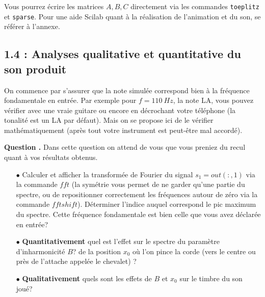 \documentclass[a4,12pt]{article}
\newcounter{Nbquestion}
\newcommand*\question{%
\stepcounter{Nbquestion}%
\textbf{Question \theNbquestion. }}
\begin{document}

  Vous pourrez écrire les matrices $A,B,C$ directement via les commandes \verb"toeplitz" et \verb"sparse".
  Pour une aide Scilab quant à la réalisation de l'animation et du son, se référer à l'annexe.

  \subsection*{1.4 : Analyses qualitative et quantitative du son produit}

  On commence par s'assurer que la note simulée correspond bien à la fréquence fondamentale en entrée. Par exemple pour $f=110~Hz$, la note LA, vous pouvez vérifier avec une vraie guitare ou encore en décrochant votre téléphone (la tonalité est un LA par défaut). Mais on se propose ici de le vérifier mathématiquement (après tout votre instrument est peut-être mal accordé). 


  \question Dans cette question on attend de vous que vous preniez du recul quant à vos résultats obtenus.\\

  \begin{itemize}
    \item[$\bullet$] Calculer et afficher la transformée de Fourier du signal $s_1=out(:,1)$ via la commande $fft$ 	(la symétrie vous permet de ne garder qu'une partie du spectre, ou de repositionner correctement les 		fréquences autour de zéro via la commande $fftshift$). Déterminer l'indice auquel correspond le pic maximum 	du spectre. Cette fréquence fondamentale est bien celle que vous avez déclarée en entrée?\\ 
    \item[$\bullet$] \textbf{Quantitativement} quel est l'effet sur le spectre du paramètre d'inharmonicité $B$? de 	la position $x_0$ où l'on pince la corde (vers le centre ou près de l'attache appelée le chevalet) ? \\ 
    \item[$\bullet$] \textbf{Qualitativement} quels sont les effets de $B$ et $x_0$ sur le timbre du son joué?\end{itemize} 


  \newpage

\end{document}
